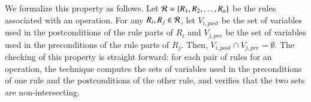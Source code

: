 We formalize this property as follows. Let ${\cal R} = \{R_1, R_2, \ldots,
R_n\}$ be the rules associated with an operation. For any $R_i, R_j \in {\cal
  R}$, let $V_{i, \mathit{post}}$ be the set of variables used in the
postconditions of the rule parts of $R_i$ and $V_{j, \mathit{pre}}$ be the set
of variables used in the preconditions of the rule parts of $R_j$. Then, $V_{i,
  \mathit{post}} \cap V_{j, \mathit{pre}} = \emptyset$. The checking of this
property is straight forward: for each pair of rules for an operation, the
technique computes the sets of variables used in the preconditions of one rule
and the postconditions of the other rule, and verifies that the two sets are
non-intersecting.
